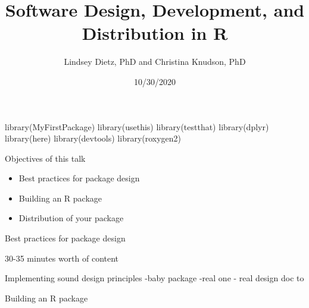 \documentclass[
  ignorenonframetext,
]{beamer}
\title{Software Design, Development, and Distribution in R}
\author{Lindsey Dietz, PhD and Christina Knudson, PhD}
\date{10/30/2020}
\newenvironment{Shaded}{}{}
\newcommand{\KeywordTok}[1]{\textcolor[rgb]{0.00,0.00,1.00}{#1}}
\newcommand{\NormalTok}[1]{#1}
\providecommand{\tightlist}{%
  \setlength{\itemsep}{0pt}\setlength{\parskip}{0pt}}
\begin{document}
\frame{\titlepage}

\begin{frame}[fragile]

\begin{Shaded}
\begin{Highlighting}[]
\KeywordTok{library}\NormalTok{(MyFirstPackage)}
\KeywordTok{library}\NormalTok{(usethis)}
\KeywordTok{library}\NormalTok{(testthat)}
\KeywordTok{library}\NormalTok{(dplyr)}
\KeywordTok{library}\NormalTok{(here)}
\KeywordTok{library}\NormalTok{(devtools)}
\KeywordTok{library}\NormalTok{(roxygen2)}
\end{Highlighting}
\end{Shaded}

\end{frame}

\begin{frame}{Objectives of this talk}
\protect\hypertarget{objectives-of-this-talk}{}

\begin{itemize}
\tightlist
\item
  Best practices for package design
\item
  Building an R package
\item
  Distribution of your package
\end{itemize}

\end{frame}

\begin{frame}{Best practices for package design}
\protect\hypertarget{best-practices-for-package-design}{}

30-35 minutes worth of content

Implementing sound design principles -baby package -real one - real
design doc to

\end{frame}

\begin{frame}{Building an R package}
\protect\hypertarget{building-an-r-package}{}

\end{frame}
\end{document}
